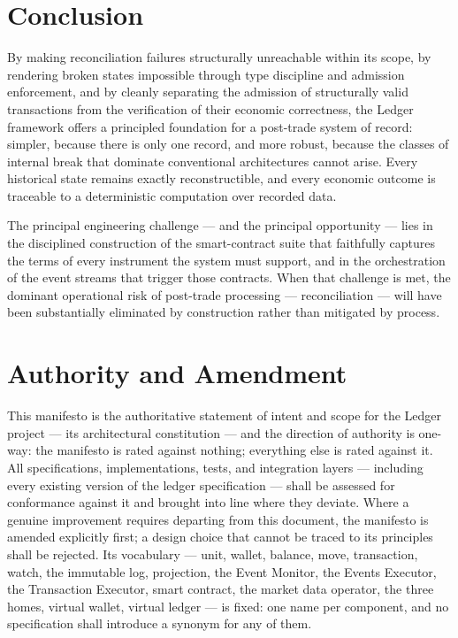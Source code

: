 \documentclass[11pt,a4paper]{article}
\newcommand{\clabel}[1]{\leavevmode\hypertarget{clause-#1}{}%
  \marginpar{\raggedright\scriptsize\ttfamily\textcolor{gray}{#1}}}
\begin{document}
\hypertarget{conclusion}{%
\section{Conclusion}\label{conclusion}}

By making reconciliation failures structurally unreachable within its
scope, by rendering broken states impossible through type discipline and
admission enforcement, and by cleanly separating the admission of
structurally valid transactions from the verification of their economic
correctness, the Ledger framework offers a principled foundation for a
post-trade system of record: simpler, because there is only one record,
and more robust, because the classes of internal break that dominate
conventional architectures cannot arise. Every historical state remains
exactly reconstructible, and every economic outcome is traceable to a
deterministic computation over recorded data.

The principal engineering challenge --- and the principal opportunity
--- lies in the disciplined construction of the smart-contract suite
that faithfully captures the terms of every instrument the system must
support, and in the orchestration of the event streams that trigger
those contracts. When that challenge is met, the dominant operational
risk of post-trade processing --- reconciliation --- will have been
substantially eliminated by construction rather than mitigated by
process.

\hypertarget{authority-and-amendment}{%
\section{Authority and Amendment}\label{authority-and-amendment}}

\clabel{C-Auth.1}This manifesto is the authoritative statement of intent and scope for
the Ledger project --- its architectural constitution --- and the
direction of authority is one-way: the manifesto is rated against
nothing; everything else is rated against it. \clabel{C-Auth.2}All specifications,
implementations, tests, and integration layers --- including every
existing version of the ledger specification --- shall be assessed for
conformance against it and brought into line where they deviate. \clabel{C-Auth.3}Where a
genuine improvement requires departing from this document, the manifesto
is amended explicitly first; a design choice that cannot be traced to
its principles shall be rejected. \clabel{C-Auth.4}Its vocabulary --- unit, wallet,
balance, move, transaction, watch, the immutable log, projection, the
Event Monitor, the Events Executor, the Transaction Executor, smart
contract, the market data operator, the three homes, virtual wallet,
virtual ledger --- is fixed: one name per component, and no
specification shall introduce a synonym for any of them.
\end{document}
